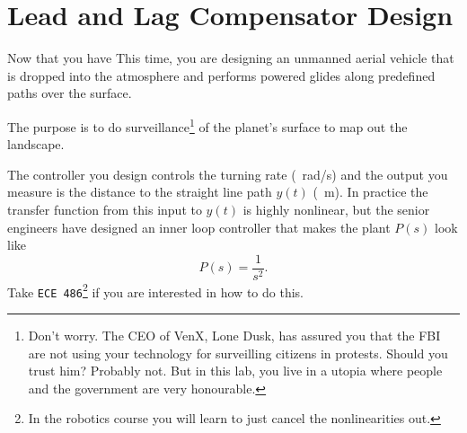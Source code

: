 \chapter{Lead and Lag Compensator Design}\label{Lab:5}
Now that you have 
This time, you are designing an unmanned aerial vehicle that is dropped into the atmosphere and performs powered glides along predefined paths over the surface.
%
\begin{center}
\end{center}
%
The purpose is to do surveillance\footnote{Don't worry. The CEO of VenX, Lone Dusk, has assured you that the FBI are not using your technology for surveilling citizens in protests. Should you trust him? Probably not. But in this lab, you live in a utopia where people and the government are very honourable.} of the planet's surface to map out the landscape.

The controller you design controls the turning rate (\SI{}{rad/s}) and the output you measure is the distance to the straight line path \(y(t)\) (\SI{}{m}).
In practice the transfer function from this input to \(y(t)\) is highly nonlinear, but the senior engineers have designed an inner loop controller that makes the plant \(P(s)\) look like
\[
  P(s) = \frac{1}{s^2}.
\]
Take \texttt{ECE 486}\footnote{In the robotics course you will learn to just cancel the nonlinearities out.} if you are interested in how to do this.

